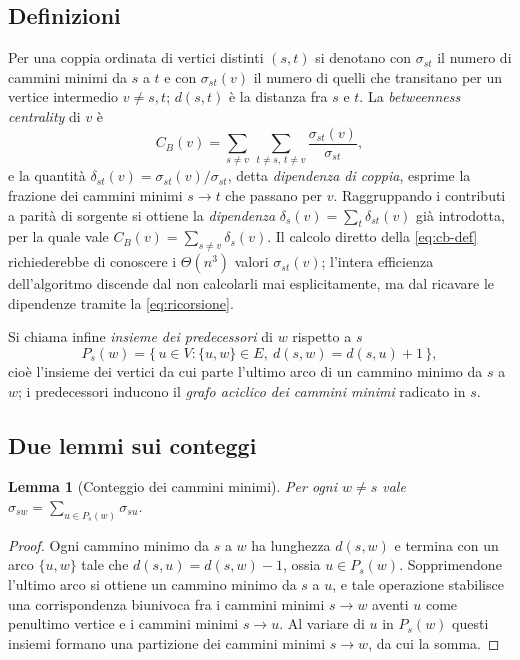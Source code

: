 \documentclass[11pt,a4paper]{report}
\newtheorem{lemma}{Lemma}
\begin{document}
\subsection*{Definizioni}

Per una coppia ordinata di vertici distinti $(s,t)$ si denotano con $\sigma_{st}$
il numero di cammini minimi da $s$ a $t$ e con $\sigma_{st}(v)$ il numero di
quelli che transitano per un vertice intermedio $v\neq s,t$; $d(s,t)$ è la
distanza fra $s$ e $t$. La \emph{betweenness centrality} di $v$ è
\begin{equation}
	C_B(v)=\sum_{s\neq v}\ \sum_{t\neq s,\,t\neq v}\frac{\sigma_{st}(v)}{\sigma_{st}},
	\label{eq:cb-def}
\end{equation}
e la quantità $\delta_{st}(v)=\sigma_{st}(v)/\sigma_{st}$, detta
\emph{dipendenza di coppia}, esprime la frazione dei cammini minimi $s\to t$ che
passano per $v$. Raggruppando i contributi a parità di sorgente si ottiene la
\emph{dipendenza} $\delta_s(v)=\sum_{t}\delta_{st}(v)$ già introdotta, per la
quale vale $C_B(v)=\sum_{s\neq v}\delta_s(v)$. Il calcolo diretto della
\eqref{eq:cb-def} richiederebbe di conoscere i $\Theta(n^3)$ valori
$\sigma_{st}(v)$; l'intera efficienza dell'algoritmo discende dal non calcolarli
mai esplicitamente, ma dal ricavare le dipendenze tramite la
\eqref{eq:ricorsione}.

Si chiama infine \emph{insieme dei predecessori} di $w$ rispetto a $s$
\[
	P_s(w)=\bigl\{\,u\in V : \{u,w\}\in E,\ d(s,w)=d(s,u)+1\,\bigr\},
\]
cioè l'insieme dei vertici da cui parte l'ultimo arco di un cammino minimo da $s$
a $w$; i predecessori inducono il \emph{grafo aciclico dei cammini minimi}
radicato in $s$.

\subsection*{Due lemmi sui conteggi}

\begin{lemma}[Conteggio dei cammini minimi]\label{lem:sigma}
	Per ogni $w\neq s$ vale $\displaystyle \sigma_{sw}=\sum_{u\in P_s(w)}\sigma_{su}$.
\end{lemma}
\begin{proof}
	\renewcommand{\qedsymbol}{}
	Ogni cammino minimo da $s$ a $w$ ha lunghezza $d(s,w)$ e termina con un arco
	$\{u,w\}$ tale che $d(s,u)=d(s,w)-1$, ossia $u\in P_s(w)$. Sopprimendone
	l'ultimo arco si ottiene un cammino minimo da $s$ a $u$, e tale operazione
	stabilisce una corrispondenza biunivoca fra i cammini minimi $s\to w$ aventi
	$u$ come penultimo vertice e i cammini minimi $s\to u$. Al variare di $u$ in
	$P_s(w)$ questi insiemi formano una partizione dei cammini minimi $s\to w$, da
	cui la somma.
\end{proof}
\end{document}
